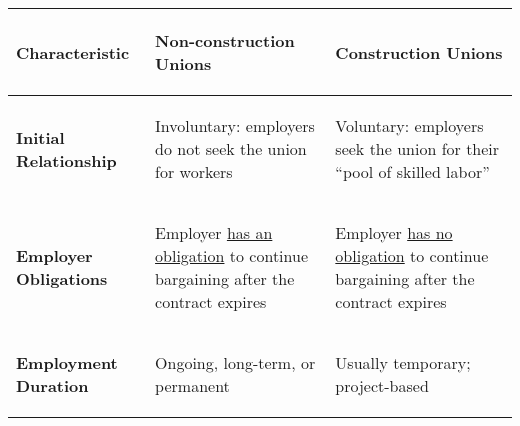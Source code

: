 \clearpage
\begin{table}[!h]
\centering
\begin{tabular}{p{30mm}p{87mm}p{87mm}}
\toprule
\midrule
\begin{center} \textbf{Characteristic} \end{center} & %
\begin{center}\textbf{Non-construction Unions}\end{center} & %
\begin{center}\textbf{Construction Unions}\end{center} \\	%
\hline
\hline

\begin{center}\textbf{Initial Relationship}\end{center} &	%
\begin{center}\begin{flushleft}Involuntary: employers do not seek the union for workers\end{flushleft}\end{center} &	%
\begin{center}\begin{flushleft}Voluntary: employers seek the union for their “pool of skilled labor”\end{flushleft}\end{center} \\ %
\hline

\begin{center}\textbf{Employer Obligations}\end{center} & %
\begin{center}\begin{flushleft}Employer \underline{has an obligation} to continue bargaining after the contract expires\end{flushleft}\end{center} & %
\begin{center}\begin{flushleft}Employer \underline{has no obligation} to continue bargaining after the contract expires\end{flushleft}\end{center} \\	%
\midrule

\begin{center}\textbf{Employment Duration}\end{center} &	%
\begin{center}\begin{flushleft}Ongoing, long-term, or permanent\end{flushleft}\end{center} &	%
\begin{center}\begin{flushleft}Usually temporary; project-based\end{flushleft}\end{center} \\ %
\midrule


\end{tabular}
\end{table}
